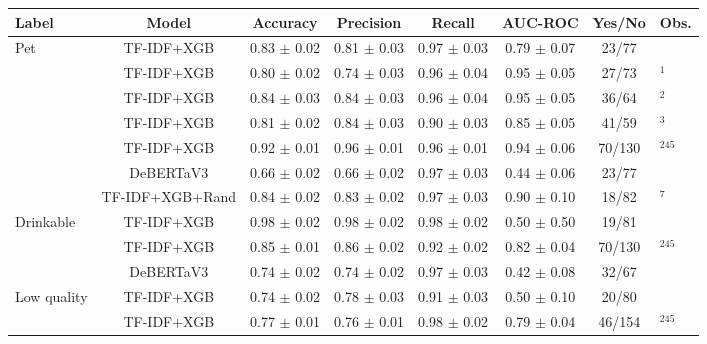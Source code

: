 \documentclass{article}
\begin{document}
\setcounter{table}{3}
\bgroup
\def\arraystretch{1.3}
\begin{table}[h]
\begin{tabular}{lccccccl}
Label                        & Model      & Accuracy        & Precision       & Recall          & AUC-ROC       & Yes/No & Obs.     \\ \hline
\multirow{6}{*}{Pet}     & TF-IDF+XGB & 0.83 $\pm$ 0.02 & 0.81 $\pm$ 0.03 & 0.97 $\pm$ 0.03 & 0.79 $\pm$ 0.07 & 23/77  &          \\ \cline{2-8} 
                             & TF-IDF+XGB & 0.80 $\pm$ 0.02 & 0.74 $\pm$ 0.03 & 0.96 $\pm$ 0.04 & 0.95 $\pm$ 0.05 & 27/73  &  $^{1}$        \\ \cline{2-8} 
                             & TF-IDF+XGB & 0.84 $\pm$ 0.03 & 0.84 $\pm$ 0.03 & 0.96 $\pm$ 0.04 & 0.95 $\pm$ 0.05 & 36/64  &  $^{2}$        \\ \cline{2-8} 
                             & TF-IDF+XGB & 0.81 $\pm$ 0.02 & 0.84 $\pm$ 0.03 & 0.90 $\pm$ 0.03 & 0.85 $\pm$ 0.05 & 41/59  &  $^{3}$        \\ \cline{2-8} 
                             & TF-IDF+XGB & 0.92 $\pm$ 0.01 & 0.96 $\pm$ 0.01 & 0.96 $\pm$ 0.01 & 0.94 $\pm$ 0.06 & 70/130 &  $^{245}$        \\ \cline{2-8} 
                             & DeBERTaV3  & 0.66 $\pm$ 0.02 & 0.66 $\pm$ 0.02 & 0.97 $\pm$ 0.03 & 0.44 $\pm$ 0.06 & 23/77  &          \\ \cline{2-8} 
                             & TF-IDF+XGB+Rand & 0.84 $\pm$ 0.02 & 0.83 $\pm$ 0.02 & 0.97 $\pm$ 0.03 & 0.90 $\pm$ 0.10 & 18/82  & $^{7}$         \\ \hline
\multirow{3}{*}{Drinkable}   & TF-IDF+XGB & 0.98 $\pm$ 0.02 & 0.98 $\pm$ 0.02 & 0.98 $\pm$ 0.02 & 0.50 $\pm$ 0.50 & 19/81  &          \\ \cline{2-8} 
                             & TF-IDF+XGB & 0.85 $\pm$ 0.01 & 0.86 $\pm$ 0.02 & 0.92 $\pm$ 0.02 & 0.82 $\pm$ 0.04 & 70/130 &  $^{245}$        \\ \cline{2-8} 
                             & DeBERTaV3  & 0.74 $\pm$ 0.02 & 0.74 $\pm$ 0.02 & 0.97 $\pm$ 0.03 & 0.42 $\pm$ 0.08 & 32/67  &          \\ \hline
\multirow{2}{*}{Low quality} & TF-IDF+XGB & 0.74 $\pm$ 0.02 & 0.78 $\pm$ 0.03 & 0.91 $\pm$ 0.03 & 0.50 $\pm$ 0.10 & 20/80  &          \\ \cline{2-8} 
                             & TF-IDF+XGB & 0.77 $\pm$ 0.01 & 0.76 $\pm$ 0.01 & 0.98 $\pm$ 0.02 & 0.79 $\pm$ 0.04 & 46/154 & $^{245}$         \\ \hline 

\end{tabular}
\end{table}
\end{document}
